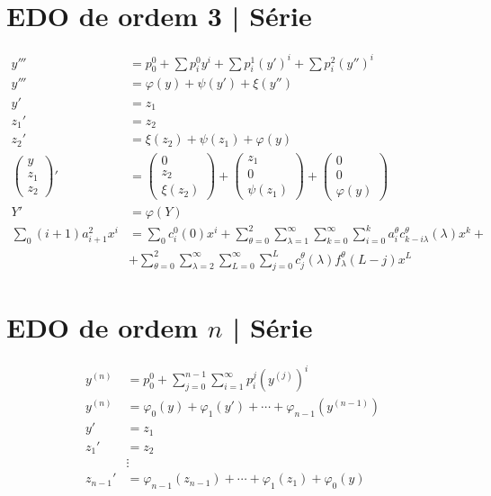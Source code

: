 \documentclass[11pt]{article}
\begin{document}
\section{EDO de ordem 3 | S\'erie}

\begin{align}
 y''' &= p_0^0 + \sum p_i^0 y^i + \sum p_i^1 (y')^i + \sum p_i^2 (y'')^i  \\
 y''' &= \varphi(y) + \psi(y') + \xi(y'') \\
 y' &= z_1 \\
 z_1' &= z_2 \\
 z_2' &= \xi(z_2) + \psi(z_1) + \varphi(y) \\
 \begin{pmatrix} y \\ z_1 \\ z_2 \end{pmatrix}' &= \begin{pmatrix}0 \\ z_2 \\ \xi(z_2) \end{pmatrix} + \begin{pmatrix} z_1 \\ 0 \\ \psi(z_1) \end{pmatrix}+ \begin{pmatrix} 0 \\ 0 \\ \varphi(y) \end{pmatrix} \\
 Y' &= \varphi(Y) \\
 \sum_0 (i + 1) a_{i + 1}^2 x^i &= \sum_0 c_i^0(0) x^i + \sum_{\theta = 0}^2 \sum_{\lambda = 1}^{\infty} \sum_{k = 0}^{\infty} \sum_{i = 0}^k a_i^{\theta} c_{k - i\lambda}^{\theta}(\lambda) x^k + \nonumber \\
 &+ \sum_{\theta = 0}^2 \sum_{\lambda = 2}^{\infty} \sum_{L = 0}^{\infty}  \sum_{j = 0}^L c_j^{\theta}(\lambda) f_{\lambda}^{\theta}(L-j) x^L
\end{align}

\section{EDO de ordem $n$ | S\'erie}

\begin{align}
y^{(n)} &= p_0^0 + \sum_{j = 0}^{n-1} \sum_{i = 1}^{\infty} p_i^j (y^{(j)})^i \\
 y^{(n)} &= \varphi_0(y) + \varphi_1(y') + \cdots + \varphi_{n-1}(y^{(n-1)}) \\
 y' &= z_1 \\
 z_1' &= z_2 \\
 &\vdots \\
 z_{n-1}' &= \varphi_{n-1}(z_{n-1}) + \cdots + \varphi_1(z_1) + \varphi_0(y)
\end{align}
\end{document}
